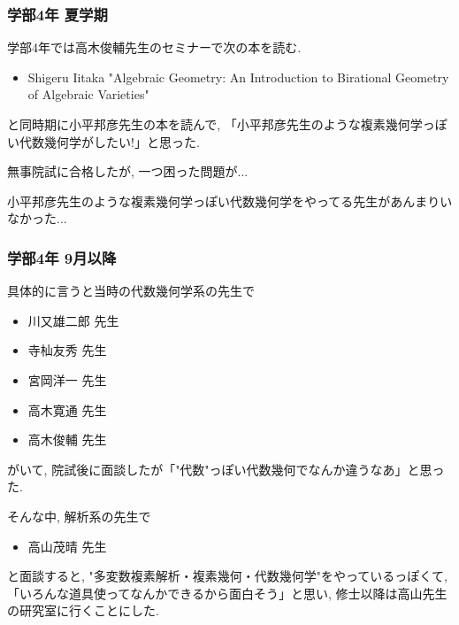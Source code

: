 \documentclass[11pt,dvipdfmx]{beamer}
\theoremstyle{definition}
\theoremstyle{remark}
\begin{document}
\begin{frame} 
 \frametitle{学部4年 夏学期}

学部4年では高木俊輔先生のセミナーで次の本を読む.
\begin{itemize}
 \item Shigeru Iitaka "Algebraic Geometry: An Introduction to Birational Geometry of Algebraic Varieties"
 \end{itemize}



と同時期に小平邦彦先生の本を読んで, 「小平邦彦先生のような複素幾何学っぽい代数幾何学がしたい!」と思った. 

\vspace{11pt}
無事院試に合格したが, 一つ困った問題が...

\pause
\begin{block}{}
小平邦彦先生のような複素幾何学っぽい代数幾何学をやってる先生があんまりいなかった...
\end{block}
\end{frame}




\begin{frame} 
 \frametitle{学部4年 9月以降}
具体的に言うと当時の代数幾何学系の先生で
\begin{itemize}
 \item 川又雄二郎 先生
 \item 寺杣友秀 先生
 \item 宮岡洋一 先生 
 \item 高木寛通 先生
 \item 高木俊輔 先生
 \end{itemize}
 がいて, 院試後に面談したが「"代数"っぽい代数幾何でなんか違うなあ」と思った. 
 
 \pause
 \vspace{11pt}
 そんな中, 解析系の先生で
\begin{itemize}
 \item 高山茂晴 先生
 \end{itemize}
と面談すると, "多変数複素解析・複素幾何・代数幾何学"をやっているっぽくて, 「いろんな道具使ってなんかできるから面白そう」と思い, 修士以降は高山先生の研究室に行くことにした. 

\end{frame}
\end{document}
